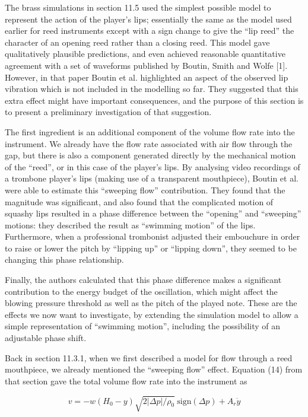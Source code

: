  The brass simulations in section 11.5 used the simplest possible model to 
  represent the action of the player's lips; essentially the same as the model 
  used earlier for reed instruments except with a sign change to give the ``lip 
  reed'' the character of an opening reed rather than a closing reed. This 
  model gave qualitatively plausible predictions, and even achieved reasonable 
  quantitative agreement with a set of waveforms published by Boutin, Smith and 
  Wolfe [1]. However, in that paper Boutin et al. highlighted an aspect of the 
  observed lip vibration which is not included in the modelling so far. They 
  suggested that this extra effect might have important consequences, and the 
  purpose of this section is to present a preliminary investigation of that 
  suggestion. 

  The first ingredient is an additional component of the volume flow rate into 
  the instrument. We already have the flow rate associated with air flow 
  through the gap, but there is also a component generated directly by the 
  mechanical motion of the ``reed'', or in this case of the player's lips. By 
  analysing video recordings of a trombone player's lips (making use of a 
  transparent mouthpiece), Boutin et al. were able to estimate this ``sweeping 
  flow'' contribution. They found that the magnitude was significant, and also 
  found that the complicated motion of squashy lips resulted in a phase 
  difference between the ``opening'' and ``sweeping'' motions: they described 
  the result as ``swimming motion'' of the lips. Furthermore, when a 
  professional trombonist adjusted their embouchure in order to raise or lower 
  the pitch by ``lipping up'' or ``lipping down'', they seemed to be changing 
  this phase relationship. 

  Finally, the authors calculated that this phase difference makes a 
  significant contribution to the energy budget of the oscillation, which might 
  affect the blowing pressure threshold as well as the pitch of the played 
  note. These are the effects we now want to investigate, by extending the 
  simulation model to allow a simple representation of ``swimming motion'', 
  including the possibility of an adjustable phase shift. 

  Back in section 11.3.1, when we first described a model for flow through a 
  reed mouthpiece, we already mentioned the ``sweeping flow'' effect. Equation 
  (14) from that section gave the total volume flow rate into the instrument as 

  $$v=-w(H_0-y) \sqrt{2 |\Delta p|/\rho_0} \mathrm{~sign} (\Delta p)+A_r 
  \dot{y} \tag{1}$$ 

